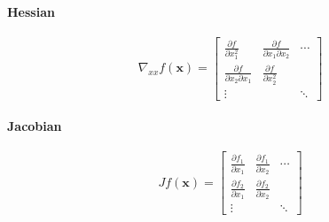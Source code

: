 \paragraph{Hessian}
\begin{equation}
  \nabla_{xx} f(\mathbf{x}) = \begin{bmatrix}
    \frac{\partial f}{\partial x_1^2} & \frac{\partial f}{\partial x_1 \partial x_2} & \cdots\\
    \frac{\partial f}{\partial x_2 \partial x_1} & \frac{\partial f}{\partial x_2^2} &\\
    \vdots & & \ddots
  \end{bmatrix}
\end{equation}

\paragraph{Jacobian}
\begin{equation}
  J f(\mathbf{x}) = \begin{bmatrix}
    \frac{\partial f_1}{\partial x_1} & \frac{\partial f_1}{\partial x_2} & \cdots\\
    \frac{\partial f_2}{\partial x_1} & \frac{\partial f_2}{\partial x_2} &\\
    \vdots & & \ddots
  \end{bmatrix}
\end{equation}
